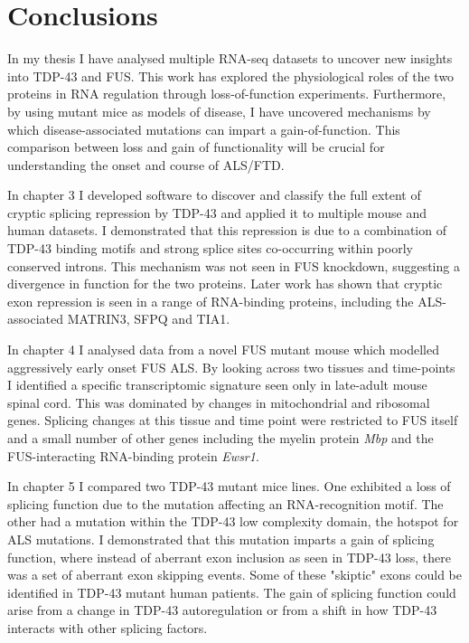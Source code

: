 \chapter{Conclusions}



In my thesis I have analysed multiple RNA-seq datasets to uncover new insights into TDP-43 and FUS.
This work has explored the physiological roles of the two proteins in RNA regulation through loss-of-function experiments.
Furthermore, by using mutant mice as models of disease, I have uncovered mechanisms by which disease-associated mutations can impart a gain-of-function. 
This comparison between loss and gain of functionality will be crucial for understanding the onset and course of ALS/FTD.

In chapter 3 I developed software to discover and classify the full extent of cryptic splicing repression by TDP-43 and applied it to multiple mouse and human datasets.
I demonstrated that this repression is due to a combination of TDP-43 binding motifs and strong splice sites co-occurring within poorly conserved introns.
This mechanism was not seen in FUS knockdown, suggesting a divergence in function for the two proteins.
Later work has shown that cryptic exon repression is seen in a range of RNA-binding proteins, including the ALS-associated MATRIN3, SFPQ and TIA1.

In chapter 4 I analysed data from a novel FUS mutant mouse which modelled aggressively early onset FUS ALS. 
By looking across two tissues and time-points I identified a specific transcriptomic signature seen only in late-adult mouse spinal cord.
This was dominated by changes in mitochondrial and ribosomal genes.
Splicing changes at this tissue and time point were restricted to FUS itself and a small number of other genes including the myelin protein \textit{Mbp} and the FUS-interacting RNA-binding protein \textit{Ewsr1}.

In chapter 5 I compared two TDP-43 mutant mice lines. 
One exhibited a loss of splicing function due to the mutation affecting an RNA-recognition motif. 
The other had a mutation within the TDP-43 low complexity domain, the hotspot for ALS mutations.
I demonstrated that this mutation imparts a gain of splicing function, where instead of aberrant exon inclusion as seen in TDP-43 loss, there was a set of aberrant exon skipping events.
Some of these "skiptic" exons could be identified in TDP-43 mutant human patients.
The gain of splicing function could arise from a change in TDP-43 autoregulation or from a shift in how TDP-43 interacts with other splicing factors. 

